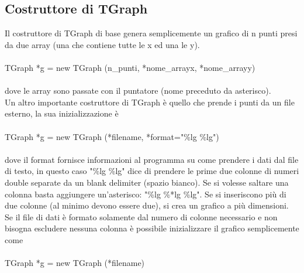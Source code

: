 \documentclass[10pt,a4paper]{article}
\begin{document}
\subsection{Costruttore di TGraph}
Il costruttore di TGraph di base genera semplicemente un grafico di n punti presi da due array (una che contiene tutte le x ed una le y). \\\\
TGraph *g = new TGraph (n\_punti, *nome\_arrayx, *nome\_arrayy)\\\\
dove le array sono passate con il puntatore (nome preceduto da asterisco).\\
Un altro importante costruttore di TGraph è quello che prende i punti da un file esterno, la sua inizializzazione è \\\\
TGraph *g = new TGraph (*filename, *format="\%lg \%lg") \\\\
dove il format fornisce informazioni al programma su come prendere i dati dal file di testo, in questo caso "\%lg \%lg" dice di prendere le prime due colonne di numeri double separate da un blank delimiter (spazio bianco). Se si volesse saltare una colonna basta aggiungere un'asterisco: "\%lg \%*lg \%lg". Se si inseriscono più di due colonne (al minimo devono essere due), si crea un grafico a più dimensioni. Se il file di dati è formato solamente dal numero di colonne necessario e non bisogna escludere nessuna colonna è possibile inizializzare il grafico semplicemente come 
\\\\
TGraph *g = new TGraph (*filename) \\\\
\end{document}
